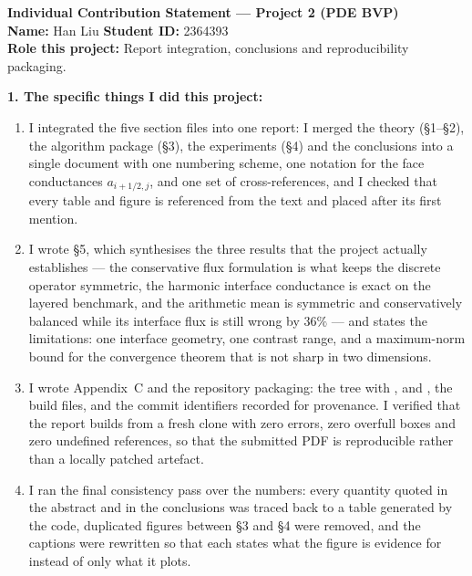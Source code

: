 \clearpage
\begin{formbox}
\small
\textbf{Individual Contribution Statement --- Project 2 (PDE BVP)}\\[0.3em]
\textbf{Name:} Han Liu \hfill \textbf{Student ID:} 2364393\\
\textbf{Role this project:} Report integration, conclusions and
reproducibility packaging.

\textbf{1. The specific things I did this project:}
\begin{enumerate}[leftmargin=1.5em,itemsep=1pt,topsep=2pt]
    \item I integrated the five section files into one report: I merged the
    theory (\S1--\S2), the algorithm package (\S3), the experiments (\S4) and
    the conclusions into a single document with one numbering scheme, one
    notation for the face conductances $a_{i+1/2,j}$, and one set of
    cross-references, and I checked that every table and figure is referenced
    from the text and placed after its first mention.
    \item I wrote \S5, which synthesises the three results that the project
    actually establishes --- the conservative flux formulation is what keeps
    the discrete operator symmetric, the harmonic interface conductance is
    exact on the layered benchmark, and the arithmetic mean is symmetric and
    conservatively balanced while its interface flux is still wrong by $36\%$
    --- and states the limitations: one interface geometry, one contrast range,
    and a maximum-norm bound for the convergence theorem that is not sharp in
    two dimensions.
    \item I wrote Appendix~C and the repository packaging: the 
    tree with ,  and , the build files,
    and the commit identifiers recorded for provenance. I verified that the
    report builds from a fresh clone with zero errors, zero overfull boxes and
    zero undefined references, so that the submitted PDF is reproducible rather
    than a locally patched artefact.
    \item I ran the final consistency pass over the numbers: every quantity
    quoted in the abstract and in the conclusions was traced back to a table
    generated by the code, duplicated figures between \S3 and \S4 were removed,
    and the captions were rewritten so that each states what the figure is
    evidence for instead of only what it plots.
\end{enumerate}


\end{formbox}
